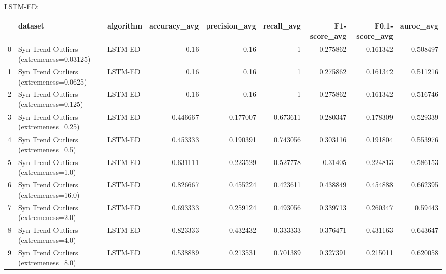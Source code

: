 LSTM-ED:

\begin{tabular}{rllrrrrrr}
\hline
    & dataset                                  & algorithm   &   accuracy\_avg &   precision\_avg &   recall\_avg &   F1-score\_avg &   F0.1-score\_avg &   auroc\_avg \\
\hline
  0 & Syn Trend Outliers (extremeness=0.03125) & LSTM-ED     &       0.16     &        0.16     &     1        &       0.275862 &         0.161342 &    0.508497 \\
  1 & Syn Trend Outliers (extremeness=0.0625)  & LSTM-ED     &       0.16     &        0.16     &     1        &       0.275862 &         0.161342 &    0.511216 \\
  2 & Syn Trend Outliers (extremeness=0.125)   & LSTM-ED     &       0.16     &        0.16     &     1        &       0.275862 &         0.161342 &    0.516746 \\
  3 & Syn Trend Outliers (extremeness=0.25)    & LSTM-ED     &       0.446667 &        0.177007 &     0.673611 &       0.280347 &         0.178309 &    0.529339 \\
  4 & Syn Trend Outliers (extremeness=0.5)     & LSTM-ED     &       0.453333 &        0.190391 &     0.743056 &       0.303116 &         0.191804 &    0.553976 \\
  5 & Syn Trend Outliers (extremeness=1.0)     & LSTM-ED     &       0.631111 &        0.223529 &     0.527778 &       0.31405  &         0.224813 &    0.586153 \\
  6 & Syn Trend Outliers (extremeness=16.0)    & LSTM-ED     &       0.826667 &        0.455224 &     0.423611 &       0.438849 &         0.454888 &    0.662395 \\
  7 & Syn Trend Outliers (extremeness=2.0)     & LSTM-ED     &       0.693333 &        0.259124 &     0.493056 &       0.339713 &         0.260347 &    0.59443  \\
  8 & Syn Trend Outliers (extremeness=4.0)     & LSTM-ED     &       0.823333 &        0.432432 &     0.333333 &       0.376471 &         0.431163 &    0.643647 \\
  9 & Syn Trend Outliers (extremeness=8.0)     & LSTM-ED     &       0.538889 &        0.213531 &     0.701389 &       0.327391 &         0.215011 &    0.620058 \\
\hline
\end{tabular}

